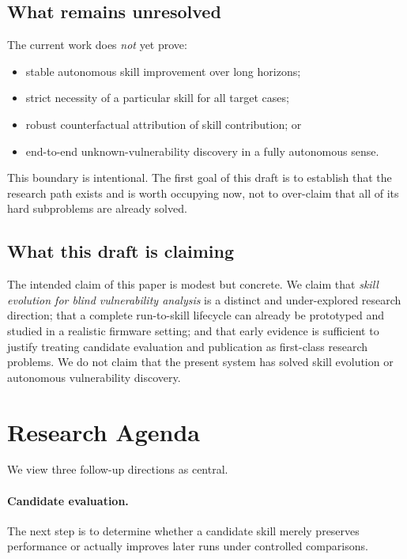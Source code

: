 \documentclass[11pt]{article}
\begin{document}
\subsection{What remains unresolved}

The current work does \emph{not} yet prove:
\begin{itemize}[leftmargin=*]
    \item stable autonomous skill improvement over long horizons;
    \item strict necessity of a particular skill for all target cases;
    \item robust counterfactual attribution of skill contribution; or
    \item end-to-end unknown-vulnerability discovery in a fully autonomous sense.
\end{itemize}

This boundary is intentional.  The first goal of this draft is to establish that the
research path exists and is worth occupying now, not to over-claim that all of its hard
subproblems are already solved.

\subsection{What this draft is claiming}

The intended claim of this paper is modest but concrete.  We claim that
\emph{skill evolution for blind vulnerability analysis} is a distinct and
under-explored research direction; that a complete run-to-skill lifecycle can already be
prototyped and studied in a realistic firmware setting; and that early evidence is
sufficient to justify treating candidate evaluation and publication as first-class
research problems.  We do not claim that the present system has solved skill evolution
or autonomous vulnerability discovery.

\section{Research Agenda}
\label{sec:agenda}

We view three follow-up directions as central.

\paragraph{Candidate evaluation.}
The next step is to determine whether a candidate skill merely preserves performance or
actually improves later runs under controlled comparisons.
\end{document}
